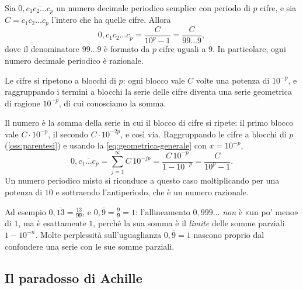 \begin{proposizione}\label{prop:periodici}
Sia $0{,}\overline{c_{1}c_{2}\ldots c_{p}}$ un numero decimale periodico semplice con periodo di $p$
cifre, e sia $C=c_{1}c_{2}\ldots c_{p}$ l'intero che ha quelle cifre. Allora
\begin{equation}\label{eq:periodici}
  0{,}\overline{c_{1}c_{2}\ldots c_{p}}=\frac C{10^{p}-1}=\frac C{99\ldots9} ,
\end{equation}
dove il denominatore $99\ldots9$ è formato da $p$ cifre uguali a $9$. In particolare, ogni
numero decimale periodico è razionale.
\end{proposizione}

\begin{schema}
\end{schema}

\begin{strategia}
Le cifre si ripetono a blocchi di $p$: ogni blocco vale $C$ volte una potenza di
$10^{-p}$, e raggruppando i termini a blocchi la serie delle cifre diventa una serie
geometrica di ragione $10^{-p}$, di cui conosciamo la somma.
\end{strategia}

\begin{dimostrazione}
Il numero è la somma della serie in cui il blocco di cifre si ripete: il primo blocco
vale $C\cdot10^{-p}$, il secondo $C\cdot10^{-2p}$, e così via. Raggruppando le cifre a blocchi
di $p$ (\cref{oss:parentesi}) e usando la \eqref{eq:geometrica-generale} con $x=10^{-p}$,
\[
  0{,}\overline{c_{1}\ldots c_{p}}=\sum_{j=1}^{\infty}C\,10^{-jp}=\frac{C\,10^{-p}}{1-10^{-p}}=\frac C{10^{p}-1} .
\]
Un numero periodico misto si riconduce a questo caso moltiplicando per una potenza di
$10$ e sottraendo l'antiperiodo, che è un numero razionale.
\end{dimostrazione}

Ad esempio $0{,}\overline{13}=\frac{13}{99}$, e $0{,}\overline{9}=\frac99=1$: l'allineamento $0{,}999\ldots$
\emph{non} è «un po' meno» di $1$, ma è esattamente $1$, perché la sua somma è il
\emph{limite} delle somme parziali $1-10^{-n}$. Molte perplessità sull'uguaglianza
$0{,}\overline9=1$ nascono proprio dal confondere una serie con le sue somme parziali.

\subsection{Il paradosso di Achille}

